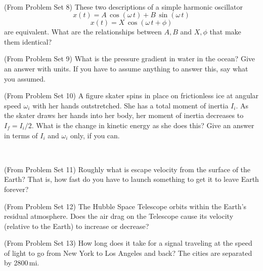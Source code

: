 \documentclass[12pt, letterpaper]{article}
\begin{document}
\vfill
~\clearpage

\begin{problem} (From Problem Set 8)
  These two descriptions of a simple harmonic oscillator
\begin{equation}
x(t) = A\,\cos(\omega\,t) + B\,\sin(\omega\,t)
\end{equation}
\begin{equation}
x(t) = X\,\cos (\omega\,t+\phi)
\end{equation}
are equivalent. What are the relationships between $A, B$
and $X, \phi$ that make them identical?
\end{problem}

\vfill

\begin{problem} (From Problem Set 9)
  What is the pressure gradient in water in the ocean?
  Give an answer with units.
  If you have to assume anything to answer this, say what you assumed.
\end{problem}

\vfill

\begin{problem} (From Problem Set 10)
  A figure skater spins in place on frictionless ice at angular speed
  $\omega_i$ with her hands outstretched.  She has a total moment of
  inertia $I_i$.  As the skater draws her hands into her body, her
  moment of inertia decreases to $I_f=I_i/2$. What is the change in
  kinetic energy as she does this? Give an answer in terms of $I_i$
  and $\omega_i$ only, if you can.
\end{problem}

\vfill
~\clearpage

\begin{problem} (From Problem Set 11)
  Roughly what is escape velocity from the surface of the Earth?
  That is, how fast do you have to launch something to get it to leave Earth forever?
\end{problem}

\vfill

\begin{problem} (From Problem Set 12)
  The Hubble Space Telescope orbits within the Earth's residual atmosphere.
  Does the air drag on the Telescope cause its velocity (relative to the Earth)
  to increase or decrease?
\end{problem}

\vfill

\begin{problem} (From Problem Set 13)
  How long does it take for a signal traveling at the speed of light to go from New York to Los Angeles and back?
  The cities are separated by 2800\,mi.
\end{problem}
\end{document}
